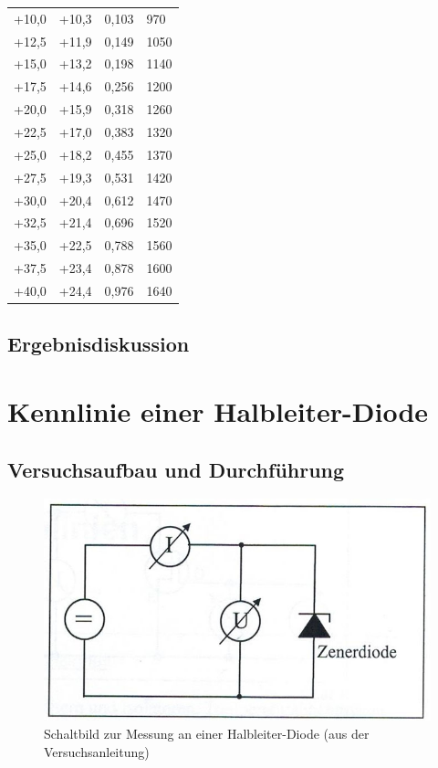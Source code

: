 \documentclass{scrartcl}
\begin{document}
\begin{table}[H]
\begin{center}
\begin{tabular}{l|l|l|l}
+10,0   &   +10,3   &   0,103   &    970 \\
+12,5   &   +11,9   &   0,149   &   1050 \\
+15,0   &   +13,2   &   0,198   &   1140 \\
+17,5   &   +14,6   &   0,256   &   1200 \\
+20,0   &   +15,9   &   0,318   &   1260 \\
+22,5   &   +17,0   &   0,383   &   1320 \\
+25,0   &   +18,2   &   0,455   &   1370 \\
+27,5   &   +19,3   &   0,531   &   1420 \\
+30,0   &   +20,4   &   0,612   &   1470 \\
+32,5   &   +21,4   &   0,696   &   1520 \\
+35,0   &   +22,5   &   0,788   &   1560 \\
+37,5   &   +23,4   &   0,878   &   1600 \\
+40,0   &   +24,4   &   0,976   &   1640 
\end{tabular}
\end{center}
\label{tab:Kohlefadenlampe}
\end{table}

\subsection{Ergebnisdiskussion}




\pagebreak
\section{Kennlinie einer Halbleiter-Diode}
\subsection{Versuchsaufbau und Durchführung}

\begin{figure}[H]
  \centering
    \includegraphics[scale=0.75]{Aufbau2.JPG}
  \caption{Schaltbild zur Messung an einer Halbleiter-Diode (aus der Versuchsanleitung)}
  \label{fig:Aufbau2}
\end{figure}
\end{document}
